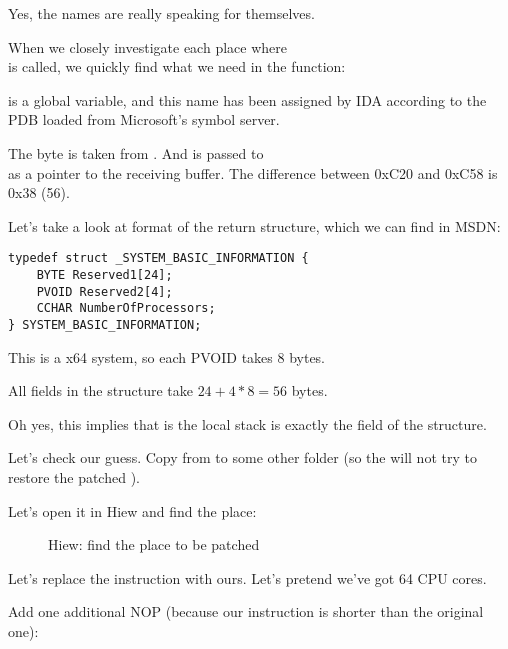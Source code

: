 Yes, the names are really speaking for themselves.

When we closely investigate each place where\\
 is called,
we quickly find what we need in the  function:



 is a global variable, and this name has been assigned by 
IDA according to the \gls{PDB} loaded from Microsoft's symbol server.

The byte is taken from . 
And  is passed to\\
as a pointer to the receiving buffer.
The difference between 0xC20 and 0xC58 is 0x38 (56).

Let's take a look at format of the return structure, which we can find in MSDN:

\begin{lstlisting}[style=customc]
typedef struct _SYSTEM_BASIC_INFORMATION {
    BYTE Reserved1[24];
    PVOID Reserved2[4];
    CCHAR NumberOfProcessors;
} SYSTEM_BASIC_INFORMATION;
\end{lstlisting}

This is a x64 system, so each PVOID takes 8 bytes.

All  fields in the structure take $24+4*8=56$ bytes.

Oh yes, this implies that  is the local stack is exactly the
 field of the  structure.

Let's check our guess.
Copy  from  
to some other folder 
(so the  
will not try to restore the patched ).

Let's open it in Hiew and find the place:

\begin{figure}[H]
\centering
{}
\caption{Hiew: find the place to be patched}
\end{figure}

Let's replace the  instruction with ours.
Let's pretend we've got 64 CPU cores.

Add one additional \ac{NOP} (because our instruction is shorter than the original one):

